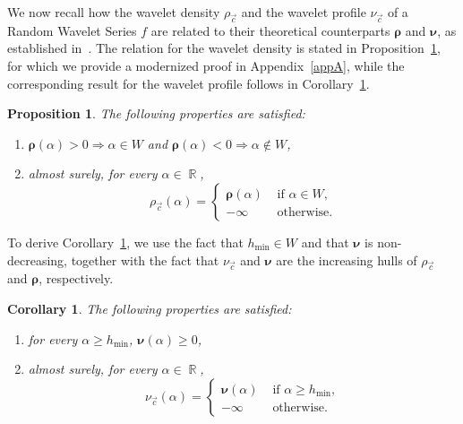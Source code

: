 \documentclass[a4paper,11pt,oneside]{article}
\DeclareMathOperator{\R}{\mathbb{R}}
\theoremstyle{definition}
\theoremstyle{plain}
\newtheorem{prop}[defi]{Proposition}
\newtheorem{cor}[defi]{Corollary}
\begin{document}
\medskip

We now recall how the wavelet density $\rho_{\vec{c}}$ and the wavelet profile $\nu_{\vec{c}}$ of a Random Wavelet Series $f$ are related to their theoretical counterparts $\bm{\rho}$ and $\bm{\nu}$, as established in~\cite{RWS}. The relation for the wavelet density is stated in Proposition~\ref{propW}, for which we provide a modernized proof in Appendix~\ref{appA}, while the corresponding result for the wavelet profile follows in Corollary~\ref{eg_nu}.

\begin{prop}\label{propW}
\cite{RWS} The following properties are satisfied:
\begin{enumerate}
\item $\bm{\rho}(\alpha)>0\Rightarrow\alpha\in W$ and $\bm{\rho}(\alpha)<0\Rightarrow\alpha\notin W$,
\item almost surely, for every $\alpha\in\R$,
\[
\rho_{\vec{c}}(\alpha)=\left\{\begin{array}{ll}
\bm{\rho}(\alpha) & \text{ if }\alpha\in W, \\
-\infty & \text{ otherwise}.
\end{array}\right.
\]
\end{enumerate}
\end{prop}



To derive Corollary~\ref{eg_nu}, we use the fact that $h_{\min}\in W$ and that $\bm{\nu}$ is non-decreasing, together with the fact that $\nu_{\vec c}$ and $\bm{\nu}$ are the increasing hulls of $\rho_{\vec c}$ and $\bm{\rho}$, respectively.


\begin{cor}\label{eg_nu}
\cite{RWS} The following properties are satisfied:
\begin{enumerate}
\item for every $\alpha\geq h_{\min}$, $\bm{\nu}(\alpha)\geq 0$,
\item almost surely, for every $\alpha\in\R$,
\[
\nu_{\vec{c}}(\alpha)=\left\{\begin{array}{ll}
\bm{\nu}(\alpha) & \text{ if }\alpha\geq h_{\min}, \\
-\infty & \text{ otherwise.}
\end{array}\right.
\]
\end{enumerate}
\end{cor}
\end{document}
